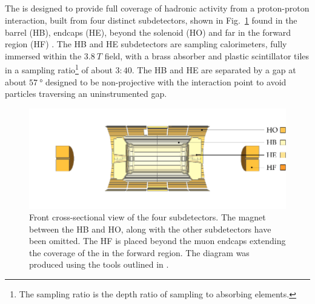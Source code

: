 \subsection{\HCAL}

The \HCAL is designed to provide full coverage of hadronic activity from a
proton-proton interaction, built from four distinct subdetectors, shown in
Fig.~\ref{fig:cms-hcal} found in the barrel (HB), endcaps (HE), beyond the
solenoid (HO) and far in the forward region (HF) \cite{Mans:1481837}. The HB
and HE subdetectors are sampling calorimeters, fully immersed within the
${\SI{3.8}{T}}$ field, with a brass absorber and plastic scintillator tiles in
a sampling ratio\footnote{The sampling ratio is the depth ratio of sampling to
absorbing elements.} of about $3:40$. The HB and HE are separated by a gap at
about $\SI{57}{\degree}$ designed to be non-projective with the interaction
point to avoid particles traversing an uninstrumented gap.

\begin{figure}[htbp]
    \centering
    \includegraphics{diagrams/tikz/cms/annotated/cms_hcal.pdf}
    \caption{
        Front cross-sectional view of the four \HCAL subdetectors. The magnet
        between the HB and HO, along with the other subdetectors have been
        omitted. The HF is placed beyond the muon endcaps extending the
        coverage of the \HCAL in the forward region. The diagram was produced
        using the tools outlined in \cite{Sakuma:2013jqa}.
    }
    \label{fig:cms-hcal}
\end{figure}

